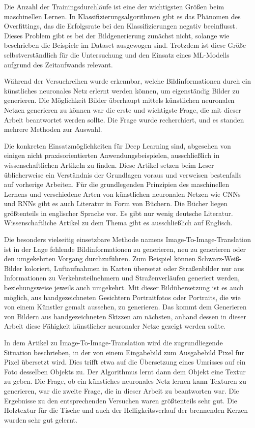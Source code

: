 Die Anzahl der Trainingsdurchläufe ist eine der wichtigsten Größen beim maschinellen Lernen. In Klassifizierungsalgorithmen gibt es das Phänomen des Overfittings, das die Erfolgsrate bei den Klassifizierungen negativ beeinflusst. Dieses Problem gibt es bei der Bildgenerierung zunächst nicht, solange wie beschrieben die Beispiele im Dataset ausgewogen sind. Trotzdem ist diese Größe selbstverständlich für die Untersuchung und den Einsatz eines ML-Modells aufgrund des Zeitaufwands relevant.

Während der Versuchreihen wurde erkennbar, welche Bildinformationen durch ein künstliches neuronales Netz erlernt werden können, um eigenständig Bilder zu generieren. Die Möglichkeit Bilder überhaupt mittels künstlichen neuronalen Netzen generieren zu können war die erste und wichtigste Frage, die mit dieser Arbeit beantwortet werden sollte. Die Frage wurde recherchiert, und es standen mehrere Methoden zur Auswahl.

Die konkreten Einsatzmöglichkeiten für Deep Learning sind, abgesehen von einigen nicht praxisorientierten Anwendungsbeispielen, ausschließlich in wissenschaftlichen Artikeln zu finden. Diese Artikel setzen beim Leser üblicherweise ein Verständnis der Grundlagen voraus und verweisen bestenfalls auf vorherige Arbeiten. Für die grundlegenden Prinzipien des maschinellen Lernens und verschiedene Arten von künstlichen neuronalen Netzen wie CNNs und RNNs gibt es auch Literatur in Form von Büchern. Die Bücher liegen größtenteils in englischer Sprache vor. Es gibt nur wenig deutsche Literatur. Wissenschaftliche Artikel zu dem Thema gibt es ausschließlich auf Englisch.

Die besonders vielseitig einsetzbare Methode namens Image-To-Image-Translation ist in der Lage fehlende Bildinformationen zu generieren, neu zu generieren oder den umgekehrten Vorgang durchzuführen. Zum Beispiel können Schwarz-Weiß-Bilder koloriert, Luftaufnahmen in Karten übersetzt oder Straßenbilder nur aus Informationen zu Verkehrsteilnehmern und Straßenverläufen generiert werden, beziehungsweise jeweils auch umgekehrt. Mit dieser Bildübersetzung ist es auch möglich, aus handgezeichneten Gesichtern Portraitfotos oder Portraits, die wie von einem Künstler gemalt aussehen, zu generieren. Das kommt dem Generieren von Bildern aus handgezeichneten Skizzen am nächsten, anhand dessen in dieser Arbeit diese Fähigkeit künstlicher neuronaler Netze gezeigt werden sollte.

In dem Artikel zu Image-To-Image-Translation wird die zugrundliegende Situation beschrieben, in der von einem Eingabebild zum Ausgabebild Pixel für Pixel übersetzt wird. Dies trifft etwa auf die Übersetzung eines Umrisses auf ein Foto desselben Objekts zu. Der Algorithmus lernt dann dem Objekt eine Textur zu geben. Die Frage, ob ein künstiches neuronales Netz lernen kann Texturen zu generieren, war die zweite Frage, die in dieser Arbeit zu beantworten war. Die Ergebnisse zu den entsprechenden Versuchen waren größtenteils sehr gut. Die Holztextur für die Tische und auch der Helligkeitsverlauf der brennenden Kerzen wurden sehr gut gelernt.

